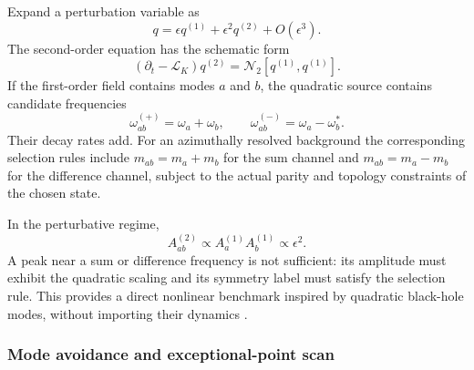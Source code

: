         Expand a perturbation variable as
        \begin{equation}
            q
            =
            \epsilon q^{(1)}
            +
            \epsilon^2q^{(2)}
            +
            O(\epsilon^3).
        \end{equation}
        The second-order equation has the schematic form
        \begin{equation}
            \left(
                \partial_t-\mathcal L_K
            \right)q^{(2)}
            =
            \mathcal N_2
            \left[
                q^{(1)},q^{(1)}
            \right].
            \label{eq:rt_qss_second_order_equation}
        \end{equation}
        If the first-order field contains modes \(a\) and \(b\), the quadratic source
        contains candidate frequencies
        \begin{equation}
            \omega_{ab}^{(+)}
            =
            \omega_a+\omega_b,
            \qquad
            \omega_{ab}^{(-)}
            =
            \omega_a-\omega_b^\ast.
            \label{eq:rt_qss_combination_frequencies}
        \end{equation}
        Their decay rates add.  For an azimuthally resolved background the corresponding
        selection rules include \(m_{ab}=m_a+m_b\) for the sum channel and
        \(m_{ab}=m_a-m_b\) for the difference channel, subject to the actual parity and
        topology constraints of the chosen state.

        In the perturbative regime,
        \begin{equation}
            A_{ab}^{(2)}
            \propto
            A_a^{(1)}A_b^{(1)}
            \propto
            \epsilon^2.
            \label{eq:rt_qss_quadratic_amplitude_scaling}
        \end{equation}
        A peak near a sum or difference frequency is not sufficient: its amplitude must
        exhibit the quadratic scaling and its symmetry label must satisfy the selection
        rule.  This provides a direct nonlinear benchmark inspired by quadratic
        black-hole modes, without importing their dynamics
        \cite{BertiEtAl2026BlackHoleSpectroscopy}.

    \subsubsection*{Mode avoidance and exceptional-point scan}

